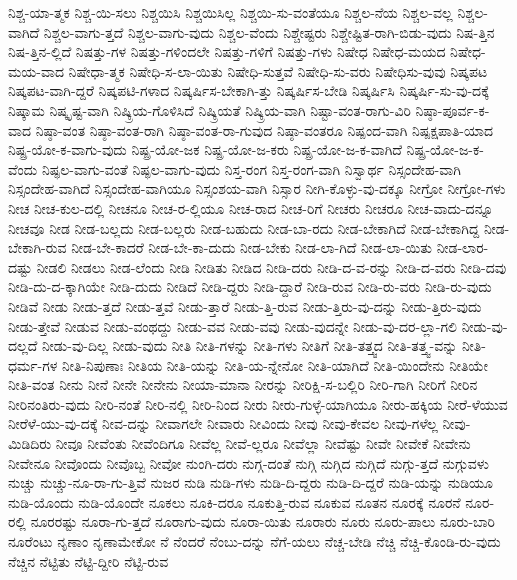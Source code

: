 {ನಿಶ್ಚ-ಯಾ-ತ್ಮಕ
ನಿಶ್ಚ-ಯಿ-ಸಲು
ನಿಶ್ಚಯಿಸಿ
ನಿಶ್ಚಯಿಸಿಲ್ಲ
ನಿಶ್ಚಯಿ-ಸು-ವಂತೆಯೂ
ನಿಶ್ಚಲ-ನೆಯ
ನಿಶ್ಚಲ-ವಲ್ಲ
ನಿಶ್ಚಲ-ವಾಗಿದೆ
ನಿಶ್ಚಲ-ವಾಗು-ತ್ತದೆ
ನಿಶ್ಚಲ-ವಾಗು-ವುದು
ನಿಶ್ಚಲ-ವೆಂದು
ನಿಶ್ಚೇಷ್ಟರು
ನಿಶ್ಚೇಷ್ಟಿತ-ರಾಗಿ-ಬಿಡು-ವುದು
ನಿಷ-ತ್ತಿನ
ನಿಷ-ತ್ತಿನ-ಲ್ಲಿದೆ
ನಿಷತ್ತು-ಗಳ
ನಿಷತ್ತು-ಗಳಿಂದಲೇ
ನಿಷತ್ತು-ಗಳಿಗೆ
ನಿಷತ್ತು-ಗಳು
ನಿಷೇಧ
ನಿಷೇಧ-ಮಯದ
ನಿಷೇಧ-ಮಯ-ವಾದ
ನಿಷೇಧಾ-ತ್ಮಕ
ನಿಷೇಧಿ-ಸ-ಲಾ-ಯಿತು
ನಿಷೇಧಿ-ಸುತ್ತವೆ
ನಿಷೇಧಿ-ಸು-ವರು
ನಿಷೇಧಿಸು-ವುವು
ನಿಷ್ಕಪಟ
ನಿಷ್ಕಪಟ-ವಾಗಿ-ದ್ದರೆ
ನಿಷ್ಕಪಟಿ-ಗಳಾದ
ನಿಷ್ಕರ್ಷಿಸ-ಬೇಕಾಗಿ-ತ್ತು
ನಿಷ್ಕರ್ಷಿಸ-ಬೇಡಿ
ನಿಷ್ಕರ್ಷಿಸಿ
ನಿಷ್ಕರ್ಷಿ-ಸು-ವು-ದಕ್ಕೆ
ನಿಷ್ಕಾಮ
ನಿಷ್ಕೃಷ್ಟ-ವಾಗಿ
ನಿಷ್ಕ್ರಿಯ-ಗೊಳಿಸಿದೆ
ನಿಷ್ಕ್ರಿಯತೆ
ನಿಷ್ಕ್ರಿಯ-ವಾಗಿ
ನಿಷ್ಟಾ-ವಂತ-ರಾಗು-ವಿರಿ
ನಿಷ್ಠಾ-ಪೂರ್ವ-ಕ-ವಾದ
ನಿಷ್ಠಾ-ವಂತ
ನಿಷ್ಠಾ-ವಂತ-ರಾಗಿ
ನಿಷ್ಠಾ-ವಂತ-ರಾ-ಗುವುದ
ನಿಷ್ಠಾ-ವಂತರೂ
ನಿಷ್ಪಂದ-ವಾಗಿ
ನಿಷ್ಪಕ್ಷಪಾತಿ-ಯಾದ
ನಿಷ್ಪ್ರ-ಯೋ-ಕ-ವಾಗು-ವುದು
ನಿಷ್ಪ್ರ-ಯೋ-ಜಕ
ನಿಷ್ಪ್ರ-ಯೋ-ಜ-ಕರು
ನಿಷ್ಪ್ರ-ಯೋ-ಜ-ಕ-ವಾಗಿದೆ
ನಿಷ್ಪ್ರ-ಯೋ-ಜ-ಕ-ವೆಂದು
ನಿಷ್ಫಲ-ವಾಗು-ವಂತೆ
ನಿಷ್ಫಲ-ವಾಗು-ವುದು
ನಿಸ್ತ-ರಂಗ
ನಿಸ್ತ-ರಂಗ-ವಾಗಿ
ನಿಸ್ವಾರ್ಥ
ನಿಸ್ಸಂದೇಹ-ವಾಗಿ
ನಿಸ್ಸಂದೇಹ-ವಾಗಿದೆ
ನಿಸ್ಸಂದೇಹ-ವಾಗಿಯೂ
ನಿಸ್ಸಂಶಯ-ವಾಗಿ
ನಿಸ್ಸಾರ
ನೀಗಿ-ಕೊಳ್ಳು-ವು-ದಕ್ಕೂ
ನೀಗ್ರೋ
ನೀಗ್ರೋ-ಗಳು
ನೀಚ
ನೀಚ-ಕುಲ-ದಲ್ಲಿ
ನೀಚನೂ
ನೀಚ-ರ-ಲ್ಲಿಯೂ
ನೀಚ-ರಾದ
ನೀಚ-ರಿಗೆ
ನೀಚರು
ನೀಚರೂ
ನೀಚ-ವಾದು-ದನ್ನೂ
ನೀಚವೂ
ನೀಡ
ನೀಡ-ಬಲ್ಲದು
ನೀಡ-ಬಲ್ಲರು
ನೀಡ-ಬಹುದು
ನೀಡ-ಬಾ-ರದು
ನೀಡ-ಬೇಕಾಗಿದೆ
ನೀಡ-ಬೇಕಾಗಿದ್ದ
ನೀಡ-ಬೇಕಾಗಿ-ರುವ
ನೀಡ-ಬೇ-ಕಾದರೆ
ನೀಡ-ಬೇ-ಕಾ-ದುದು
ನೀಡ-ಬೇಕು
ನೀಡ-ಲಾ-ಗಿದೆ
ನೀಡ-ಲಾ-ಯಿತು
ನೀಡ-ಲಾರ-ದಷ್ಟು
ನೀಡಲಿ
ನೀಡಲು
ನೀಡ-ಲೆಂದು
ನೀಡಿ
ನೀಡಿತು
ನೀಡಿದ
ನೀಡಿ-ದರು
ನೀಡಿ-ದ-ವ-ರನ್ನು
ನೀಡಿ-ದ-ವರು
ನೀಡಿ-ದವು
ನೀಡಿ-ದು-ದ-ಕ್ಕಾಗಿಯೇ
ನೀಡಿ-ದುದು
ನೀಡಿದೆ
ನೀಡಿ-ದ್ದರು
ನೀಡಿ-ದ್ದಾರೆ
ನೀಡಿ-ರುವ
ನೀಡಿ-ರು-ವರು
ನೀಡಿ-ರು-ವುದು
ನೀಡಿವೆ
ನೀಡು
ನೀಡು-ತ್ತದೆ
ನೀಡು-ತ್ತವೆ
ನೀಡು-ತ್ತಾರೆ
ನೀಡು-ತ್ತಿ-ರುವ
ನೀಡು-ತ್ತಿರು-ವು-ದನ್ನು
ನೀಡು-ತ್ತಿರು-ವುದು
ನೀಡು-ತ್ತೇವೆ
ನೀಡುವ
ನೀಡು-ವಂಥದ್ದು
ನೀಡು-ವವ
ನೀಡು-ವವು
ನೀಡು-ವುದನ್ನೇ
ನೀಡು-ವು-ದರ-ಲ್ಲಾ-ಗಲಿ
ನೀಡು-ವು-ದಲ್ಲದೆ
ನೀಡು-ವು-ದಿಲ್ಲ
ನೀಡು-ವುದು
ನೀತಿ
ನೀತಿ-ಗಳನ್ನು
ನೀತಿ-ಗಳು
ನೀತಿಗೆ
ನೀತಿ-ತತ್ತ್ವದ
ನೀತಿ-ತತ್ತ್ವ-ವನ್ನು
ನೀತಿ-ಧರ್ಮ-ಗಳ
ನೀತಿ-ನಿಪುಣಾಃ
ನೀತಿಯ
ನೀತಿ-ಯನ್ನು
ನೀತಿ-ಯ-ನ್ನೇನೋ
ನೀತಿ-ಯಾಗಿದೆ
ನೀತಿ-ಯಿಂದೇನು
ನೀತಿಯೇ
ನೀತಿ-ವಂತ
ನೀನು
ನೀನೆ
ನೀನೇ
ನೀನೇನು
ನೀಯಾ-ಮಾನಾ
ನೀರನ್ನು
ನೀರಿಕ್ಷಿ-ಸ-ಬಲ್ಲಿರಿ
ನೀರಿ-ಗಾಗಿ
ನೀರಿಗೆ
ನೀರಿನ
ನೀರಿನಂತಿರು-ವುದು
ನೀರಿ-ನಂತೆ
ನೀರಿ-ನಲ್ಲಿ
ನೀರಿ-ನಿಂದ
ನೀರು
ನೀರು-ಗುಳ್ಳೆ-ಯಾಗಿಯೂ
ನೀರು-ಹಕ್ಕಿಯ
ನೀರೆ-ಳೆಯುವ
ನೀರೆಳೆ-ಯು-ವು-ದಕ್ಕೆ
ನೀವ-ದನ್ನು
ನೀವಾಗಲೇ
ನೀವಾರು
ನೀವಿಂದು
ನೀವು
ನೀವು-ಕೇವಲ
ನೀವು-ಗಳೆಲ್ಲ
ನೀವು-ಮಿಡಿದಿರು
ನೀವೂ
ನೀವೆಂತು
ನೀವೆಂದಿಗೂ
ನೀವೆಲ್ಲ
ನೀವೆ-ಲ್ಲರೂ
ನೀವೆಲ್ಲಾ
ನೀವೆಷ್ಟು
ನೀವೇ
ನೀವೇಕೆ
ನೀವೇನು
ನೀವೇನೂ
ನೀವೊಂದು
ನೀವೊಬ್ಬ
ನೀವೋ
ನುಂಗಿ-ದರು
ನುಗ್ಗ-ದಂತೆ
ನುಗ್ಗಿ
ನುಗ್ಗಿದ
ನುಗ್ಗಿದೆ
ನುಗ್ಗು-ತ್ತದೆ
ನುಗ್ಗುವಳು
ನುಚ್ಚು
ನುಚ್ಚು-ನೂ-ರಾ-ಗು-ತ್ತಿವೆ
ನುಜರ
ನುಡಿ
ನುಡಿ-ಗಳು
ನುಡಿ-ದಿ-ದ್ದರು
ನುಡಿ-ದಿ-ದ್ದರೆ
ನುಡಿ-ಯನ್ನು
ನುಡಿಯೂ
ನುಡಿ-ಯೊಂದು
ನುಡಿ-ಯೊಂದೇ
ನೂಕಲು
ನೂಕಿ-ದರೂ
ನೂಕುತ್ತಿ-ರುವ
ನೂಕುವ
ನೂತನ
ನೂರಕ್ಕೆ
ನೂರನೆ
ನೂರ-ರಲ್ಲಿ
ನೂರರಷ್ಟು
ನೂರಾ-ಗು-ತ್ತದೆ
ನೂರಾಗು-ವುದು
ನೂರಾ-ಯಿತು
ನೂರಾರು
ನೂರು
ನೂರು-ಪಾಲು
ನೂರು-ಬಾರಿ
ನೂರೆಂಟು
ನೃಣಾಂ
ನೃಣಾಮೇಕೋ
ನೆ
ನೆಂದರೆ
ನೆಂಬು-ದನ್ನು
ನೆಗೆ-ಯಲು
ನೆಚ್ಚ-ಬೇಡಿ
ನೆಚ್ಚಿ
ನೆಚ್ಚಿ-ಕೊಂಡಿ-ರು-ವುದು
ನೆಚ್ಚಿನ
ನೆಟ್ಟಿತು
ನೆಟ್ಟಿ-ದ್ದೀರಿ
ನೆಟ್ಟಿ-ರುವ
}

